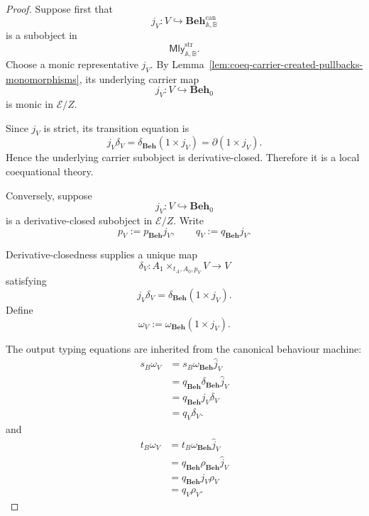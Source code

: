 \begin{proof}
    Suppose first that
    \[
        j_V:
        V\hookrightarrow
        \mathbf{Beh}^{\mathrm{can}}_{\mathbb A,\mathbb B}
    \]
    is a subobject in
    \[
        \mathsf{Mly}^{\mathrm{str}}_{\mathbb A,\mathbb B}.
    \]
    Choose a monic representative \(j_V\). By
    Lemma~\ref{lem:coeq-carrier-created-pullbacks-monomorphisms}, its
    underlying carrier map
    \[
        j_V:V\hookrightarrow\mathbf{Beh}_0
    \]
    is monic in \(\mathcal E/Z\).

    Since \(j_V\) is strict, its transition equation is
    \[
        j_V\delta_V
        =
        \delta_{\mathbf{Beh}}(1\times j_V)
        =
        \partial(1\times j_V).
    \]
    Hence the underlying carrier subobject is derivative-closed. Therefore it
    is a local coequational theory.

    Conversely, suppose
    \[
        j_V:V\hookrightarrow\mathbf{Beh}_0
    \]
    is a derivative-closed subobject in \(\mathcal E/Z\). Write
    \[
        p_V:=p_{\mathbf{Beh}}j_V,
        \qquad
        q_V:=q_{\mathbf{Beh}}j_V.
    \]

    Derivative-closedness supplies a unique map
    \[
        \delta_V:
        A_1\times_{t_A,A_0,p_V}V
        \to
        V
    \]
    satisfying
    \[
        j_V\delta_V
        =
        \delta_{\mathbf{Beh}}(1\times j_V).
    \]
    Define
    \[
        \omega_V
        :=
        \omega_{\mathbf{Beh}}(1\times j_V).
    \]

    The output typing equations are inherited from the canonical behaviour
    machine:
    \[
    \begin{aligned}
        s_B\omega_V
        &=
        s_B\omega_{\mathbf{Beh}}\widehat j_V
        \\
        &=
        q_{\mathbf{Beh}}
        \delta_{\mathbf{Beh}}
        \widehat j_V
        \\
        &=
        q_{\mathbf{Beh}}j_V\delta_V
        \\
        &=
        q_V\delta_V.
    \end{aligned}
    \]
    and
    \[
    \begin{aligned}
        t_B\omega_V
        &=
        t_B\omega_{\mathbf{Beh}}\widehat j_V
        \\
        &=
        q_{\mathbf{Beh}}
        \rho_{\mathbf{Beh}}
        \widehat j_V
        \\
        &=
        q_{\mathbf{Beh}}j_V\rho_V
        \\
        &=
        q_V\rho_V.
    \end{aligned}
    \]
    

\end{proof}

